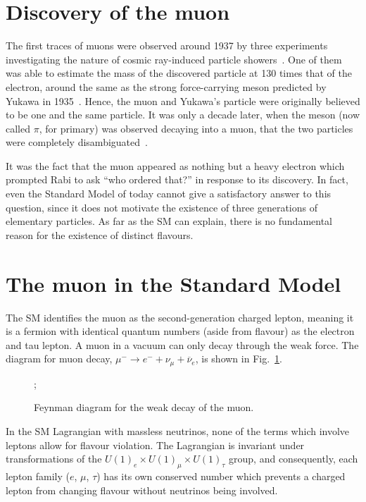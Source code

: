 \section{Discovery of the muon}
The first traces of muons were observed around 1937 by three experiments
investigating the nature of cosmic ray-induced particle
showers~\cite{PhysRev.51.884, PhysRev.52.1198, PhysRev.52.1003}. 
One of them was able to estimate the mass of the discovered
particle at 130 times that of the electron, around the same as the strong
force-carrying meson predicted by Yukawa in 1935~\cite{10.1143/PTPS.1.1}. 
Hence, the muon and Yukawa's particle were
originally believed to be one and the same particle. It was only a decade later, when
the meson (now called $\pi$, for primary) was observed decaying into a muon,
that the two particles were completely disambiguated~\cite{LATTES1947}.

It was the fact that the muon appeared as nothing but a heavy electron which
prompted Rabi to ask ``who ordered that?'' in response to its discovery. In
fact, even the Standard Model of today cannot give a satisfactory answer to this
question, since it does not motivate the existence of three generations of
elementary particles. As far as the SM can explain, there is no fundamental reason
for the existence of distinct flavours.

\section{The muon in the Standard Model}
% 
The SM identifies the muon as the second-generation charged lepton, meaning it
is a fermion with identical quantum numbers (aside from flavour) as the electron
and tau lepton. A muon in a vacuum can only decay through the weak force. The
diagram for muon decay, $\mu^- \rightarrow e^- +  \nu_\mu + \overline{\nu}_e$,
is shown in Fig.~\ref{fig:weak_decay}.


\begin{figure}
    \centering
    ;
    \caption{Feynman diagram for the weak decay of the muon.}
    \label{fig:weak_decay}
\end{figure}

In the SM Lagrangian with massless neutrinos, none of the terms which involve
leptons allow for flavour violation. The Lagrangian is invariant under
transformations of the ${U(1)_e \times U(1)_\mu \times U(1)_\tau}$ group, and
consequently, each lepton family ($e$, $\mu$, $\tau$) has its own conserved
number which prevents a charged lepton from changing flavour without neutrinos
being involved. 

